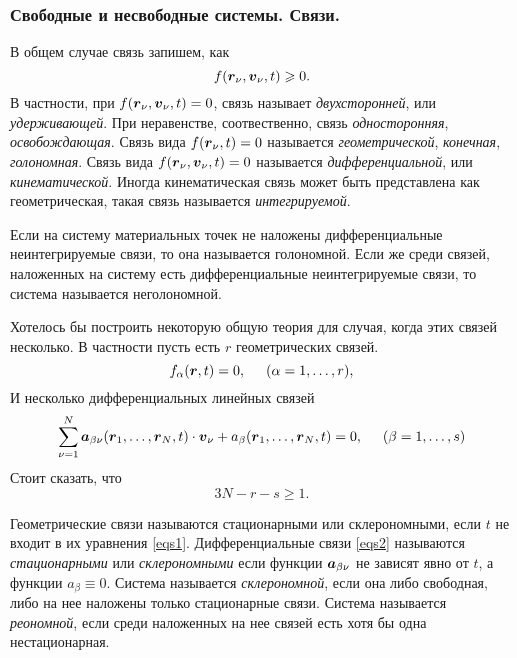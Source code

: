 \subsubsection*{Свободные и несвободные системы. Связи.}

В общем случае связь запишем, как
$$
    f(\mbox{\boldmath $r$}_\nu, \mbox{\boldmath $v$}_\nu, t) \geqslant 0.
$$
В частности, при $f(\mbox{\boldmath $r$}_\nu, \mbox{\boldmath $v$}_\nu, t) = 0$, связь называет \textit{двухсторонней}, или \textit{удерживающей}. При неравенстве, соотвественно, связь \textit{односторонняя}, \textit{освобождающая}.
Связь вида $f(\mbox{\boldmath $r$}_\nu, t) = 0$ называется \textit{геометрической}, \textit{конечная}, \textit{голономная}. Связь вида $f(\mbox{\boldmath $r$}_\nu, \mbox{\boldmath $v$}_\nu, t) = 0$ называется \textit{дифференциальной}, или \textit{кинематической}. Иногда кинематическая связь может быть представлена как геометрическая, такая связь называется \textit{интегрируемой}. 

\begin{to_def} 
     Если на систему материальных точек не наложены дифференциальные неинтегрируемые связи, то она называется голономной. Если же среди связей, наложенных на систему есть дифференциальные неинтегрируемые связи, то система называется неголономной.
\end{to_def}

Хотелось бы построить некоторую общую теория для случая, когда этих связей несколько. 
В частности пусть есть $r$ геометрических связей.
\begin{equation}
\label{eqs1}
    f_\alpha (\mbox{\boldmath $r$}, t) = 0, \hspace{0.5cm} (\alpha = 1, \ldots, r),
\end{equation}
И несколько дифференциальных линейных связей
\begin{equation}
\label{eqs2}
    \sum_{\nu=1}^N \mbox{\boldmath $a$}_{\beta \nu} (\mbox{\boldmath $r$}_1, \ldots, \mbox{\boldmath $r$}_N, t) \cdot \mbox{\boldmath $v$}_\nu + a_\beta  (\mbox{\boldmath $r$}_1, \ldots, \mbox{\boldmath $r$}_N, t) = 0,
    \hspace{0.5cm} (\beta = 1, \ldots, s)
\end{equation}
Стоит сказать, что
$$
    3N - r - s \geq 1.
$$

\begin{to_def} 
     Геометрические связи называются стационарными или склерономными, если $t$ не входит в их уравнения \eqref{eqs1}. Дифференциальные связи \eqref{eqs2} называются \textit{стационарными} или \textit{склерономными} если функции $\mbox{\boldmath $a$}_{\beta\nu}$ не зависят явно от $t$, а функции $a_\beta \equiv 0$. Система называется \textit{склерономной}, если она либо свободная, либо на нее наложены только стационарные связи. Система называется \textit{реономной}, если среди наложенных на нее связей есть хотя бы одна нестационарная.
\end{to_def}

